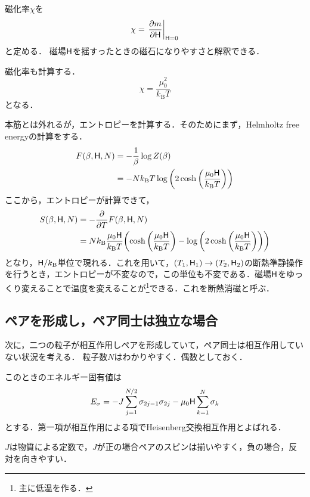 	\begin{defn}[$\mf=0$での磁化率]
			磁化率$\chi$を
			\begin{equation}
					\chi = \left.\pdv{m}{\mathsf{H}}\right|_{\mathsf{H}=0}
			\end{equation}
			と定める．
			磁場$\mathsf{H}$を揺すったときの磁石になりやすさと解釈できる．
	\end{defn}

	磁化率も計算する．
	\begin{equation}
			\chi = \frac{\mu_{0}^{2}}{k_{\text{B}}T}\label{eq:single_suscep}
	\end{equation}
	となる．

	本筋とは外れるが，エントロピーを計算する．そのためにまず，Helmholtz free energyの計算をする．
	\begin{align}
			F(\beta, \mathsf{H}, N)&= -\frac{1}{\beta}\log Z(\beta)\\
							&= -Nk_{\text{B}}T\log\qty(2\cosh\qty(\frac{\mu_0\mathsf{H}}{k_{\text{B}}T}))
	\end{align}
	ここから，エントロピーが計算できて，
	\begin{align}
			S(\beta, \mathsf{H}, N) &= -\pdv{}{T}F(\beta, \mathsf{H}, N)\\
							 &= Nk_{\text{B}}\frac{\mu_0\mathsf{H}}{k_{\text{B}}T}\qty(\cosh\qty(\frac{\mu_0\mathsf{H}}{k_{\text{B}}T}) - \log \qty(2\cosh\qty(\frac{\mu_0\mathsf{H}}{k_{\text{B}}T})))
	\end{align}
	となり，$\mathsf{H}/k_{\text{B}}$単位で現れる．これを用いて，$(T_1, \mathsf{H}_1)\rightarrow(T_2, \mathsf{H}_2)$の断熱準静操作を行うとき，エントロピーが不変なので，この単位も不変である．磁場$\mathsf{H}$をゆっくり変えることで温度を変えることが\footnote{主に低温を作る．}できる．これを断熱消磁と呼ぶ．

	\subsection{ペアを形成し，ペア同士は独立な場合}
	次に，二つの粒子が相互作用しペアを形成していて，ペア同士は相互作用していない状況を考える．
	粒子数$N$はわかりやすく．偶数としておく．

	このときのエネルギー固有値は
	\begin{equation}
			E_{\sigma} = -J\sum_{j = 1}^{N/2}\sigma_{2j-1}\sigma_{2j} - \mu_0 \mathsf{H} \sum_{k=1}^{N}\sigma_k\label{eq:exchange}
	\end{equation}
	とする．第一項が相互作用による項でHeisenberg交換相互作用とよばれる．

	$J$は物質による定数で，$J$が正の場合ペアのスピンは揃いやすく，負の場合，反対を向きやすい．

